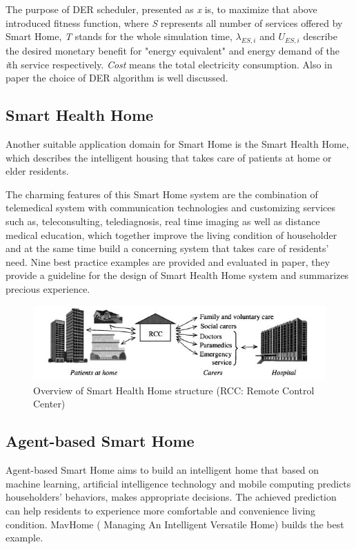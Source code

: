 The purpose of DER scheduler, presented as \emph{x} is, to maximize that above introduced fitness function, where \emph{S} represents all number of services offered by Smart Home, \emph{T} stands for the whole simulation time, $\lambda_{ES,i}$ and $ U_{ES,i}$ describe the desired monetary benefit for "energy equivalent" and energy demand of the \emph{i}th service respectively. \emph{Cost} means the total electricity consumption. Also in paper\cite{smart_home_for_energy} the choice of DER algorithm is well discussed.


\subsection{Smart Health Home}
Another suitable application domain for Smart Home is the Smart Health Home, which describes the intelligent housing that takes care of patients at home or elder residents.

The charming features of this Smart Home system are the combination of telemedical system with communication technologies and customizing services such as, teleconsulting, telediagnosis, real time imaging as well as distance medical education\cite{smart_home_for_health}, which together improve the living condition of householder and at the same time build a concerning system that takes care of residents' need. Nine best practice examples are provided and evaluated in paper\cite{smart_home_for_old}, they provide a guideline for  the design of Smart Health Home system and summarizes precious experience. 
 \begin{figure}[!htbp]
	\centering
	\includegraphics[width=1.0\textwidth]{rcc.jpg}
		\caption{Overview of Smart Health Home structure\cite{smart_home_for_health} (RCC: Remote Control Center)}
	\label{fig:rcc}
\end{figure}
\subsection{Agent-based Smart Home}
Agent-based Smart Home aims to build an intelligent home that based on machine learning, artificial intelligence technology and mobile computing predicts householders' behaviors, makes appropriate decisions. The achieved prediction can help residents to experience more comfortable and convenience living condition. MavHome ( Managing An Intelligent Versatile Home)\cite{smart_home_agent} builds the best example. 

